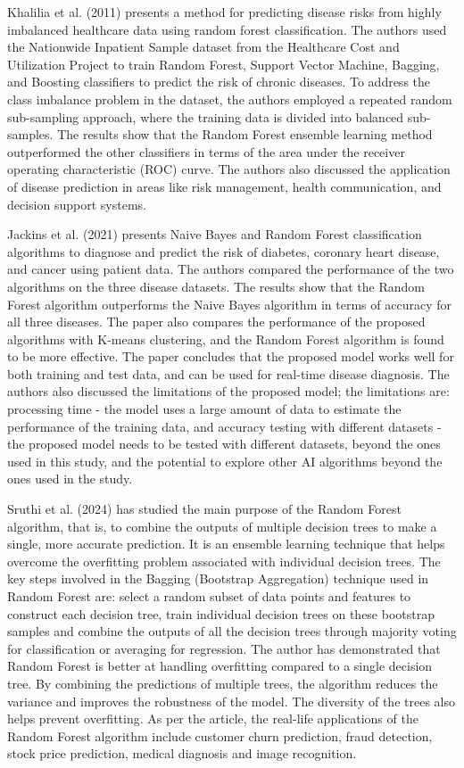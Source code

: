 \documentclass[11pt,a4paper]{article}
\begin{document}
Khalilia et al. (2011) presents a method for predicting disease risks from highly imbalanced healthcare data using random forest classification. The authors used the Nationwide Inpatient Sample dataset from the Healthcare Cost and Utilization Project to train Random Forest, Support Vector Machine, Bagging, and Boosting classifiers to predict the risk of chronic diseases. To address the class imbalance problem in the dataset, the authors employed a repeated random sub-sampling approach, where the training data is divided into balanced sub-samples. The results show that the Random Forest ensemble learning method outperformed the other classifiers in terms of the area under the receiver operating characteristic (ROC) curve. The authors also discussed the application of disease prediction in areas like risk management, health communication, and decision support systems.

Jackins et al. (2021) presents Naive Bayes and Random Forest classification algorithms to diagnose and predict the risk of diabetes, coronary heart disease, and cancer using patient data. The authors compared the performance of the two algorithms on the three disease datasets. The results show that the Random Forest algorithm outperforms the Naive Bayes algorithm in terms of accuracy for all three diseases. The paper also compares the performance of the proposed algorithms with K-means clustering, and the Random Forest algorithm is found to be more effective. The paper concludes that the proposed model works well for both training and test data, and can be used for real-time disease diagnosis. The authors also discussed the limitations of the proposed model; the limitations are: processing time - the model uses a large amount of data to estimate the performance of the training data, and accuracy testing with different datasets - the proposed model needs to be tested with different datasets, beyond the ones used in this study, and the potential to explore other AI algorithms beyond the ones used in the study. 

Sruthi et al. (2024) has studied the main purpose of the Random Forest algorithm, that is, to combine the outputs of multiple decision trees to make a single, more accurate prediction. It is an ensemble learning technique that helps overcome the overfitting problem associated with individual decision trees. The key steps involved in the Bagging (Bootstrap Aggregation) technique used in Random Forest are: select a random subset of data points and features to construct each decision tree, train individual decision trees on these bootstrap samples and combine the outputs of all the decision trees through majority voting for classification or averaging for regression. The author has demonstrated that Random Forest is better at handling overfitting compared to a single decision tree. By combining the predictions of multiple trees, the algorithm reduces the variance and improves the robustness of the model. The diversity of the trees also helps prevent overfitting. As per the article, the real-life applications of the Random Forest algorithm include customer churn prediction, fraud detection, stock price prediction, medical diagnosis and image recognition.
\end{document}

